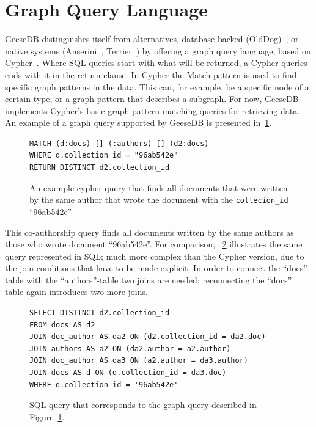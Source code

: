 \section{Graph Query Language}
GeeseDB distinguishes itself from alternatives, database-backed (OldDog)~\citep{olddog-docker}, or native systems (Anserini~\citep{anserini}, Terrier~\citep{terrier}) by offering a graph query language, based on Cypher~\citep{cypher}. 
Where SQL queries start with what will be returned, a Cypher queries ends with it in the return clause. In Cypher  the Match pattern is used to find specific graph patterns in the data. This can, for example, be a specific node of a certain type, or a graph pattern that describes a subgraph. 
For now, GeeseDB implements Cypher's basic graph pattern-matching queries for retrieving data. An example of a graph query supported by GeeseDB is presented in~\cref{fig:graph_query}.
\begin{figure}
	\begin{verbatim}
MATCH (d:docs)-[]-(:authors)-[]-(d2:docs)
WHERE d.collection_id = "96ab542e"
RETURN DISTINCT d2.collection_id
	\end{verbatim}
	\caption{An example cypher query that finds all documents that were written by the same author that wrote the document with the \texttt{collecion\_id} ``96ab542e''}
	\label{fig:graph_query}
\end{figure}
This co-authorship query finds all documents written by the same authors as those who wrote document ``96ab542e''. For comparison, ~\cref{fig:corresponding_sql} illustrates the same query represented in SQL; much more complex than the Cypher version, due to the join conditions that have to be made explicit. In order to connect the ``docs''-table with the ``authors''-table two joins are needed; reconnecting the ``docs'' table again introduces two more joins.

\begin{figure}
	\begin{verbatim}
SELECT DISTINCT d2.collection_id
FROM docs AS d2
JOIN doc_author AS da2 ON (d2.collection_id = da2.doc)
JOIN authors AS a2 ON (da2.author = a2.author)
JOIN doc_author AS da3 ON (a2.author = da3.author)
JOIN docs AS d ON (d.collection_id = da3.doc)
WHERE d.collection_id = '96ab542e'
	\end{verbatim}
	\caption{SQL query that corresponds to the graph query described in Figure~\ref{fig:graph_query}.}
	\label{fig:corresponding_sql}
\end{figure}

